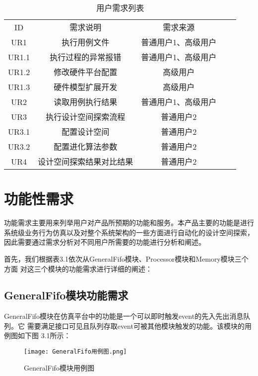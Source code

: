\begin{table}[htb]
    \centering\normalsize
    \caption{用户需求列表}
    \begin{tabular}{|c|c|c|ll}
    \cline{1-3}
    ID    & 需求说明         & 需求来源       &  &  \\ \cline{1-3}
    UR1   & 执行用例文件       & 普通用户1、高级用户 &  &  \\ \cline{1-3}
    UR1.1 & 执行过程的异常报错    & 普通用户1、高级用户 &  &  \\ \cline{1-3}
    UR1.2 & 修改硬件平台配置     & 高级用户       &  &  \\ \cline{1-3}
    UR1.3 & 硬件模型扩展开发     & 高级用户       &  &  \\ \cline{1-3}
    UR2   & 读取用例执行结果     & 普通用户1、高级用户 &  &  \\ \cline{1-3}
    UR3   & 执行设计空间探索流程   & 普通用户2      &  &  \\ \cline{1-3}
    UR3.1 & 配置设计空间       & 普通用户2      &  &  \\ \cline{1-3}
    UR3.2 & 配置进化算法参数     & 普通用户2      &  &  \\ \cline{1-3}
    UR4   & 设计空间探索结果对比结果 & 普通用户2      &  &  \\ \cline{1-3}
    \end{tabular}
    \end{table}

\section{功能性需求}
功能需求主要用来列举用户对产品所预期的功能和服务。本产品主要的功能是进行
系统级业务行为仿真以及对整个系统架构的一些方面进行自动化的设计空间探索，
因此需要通过需求分析对不同用户所需要的功能进行分析和阐述。

首先，我们根据表3.1依次从GeneralFifo模块、Processor模块和Memory模块三个方面
对这三个模块的功能需求进行详细的阐述：

\subsection{GeneralFifo模块功能需求}
GeneralFifo模块在仿真平台中的功能是一个可以即时触发event的先入先出消息队列。它
需要满足接口可见且队列存取event可被其他模块触发的功能。该模块的用例图如下图
3.1所示：

\begin{figure}[h]
    \centering
    \texttt{[image: GeneralFifo用例图.png]}
    \caption{GeneralFifo模块用例图}
    \label{fig:badge}
\end{figure}

